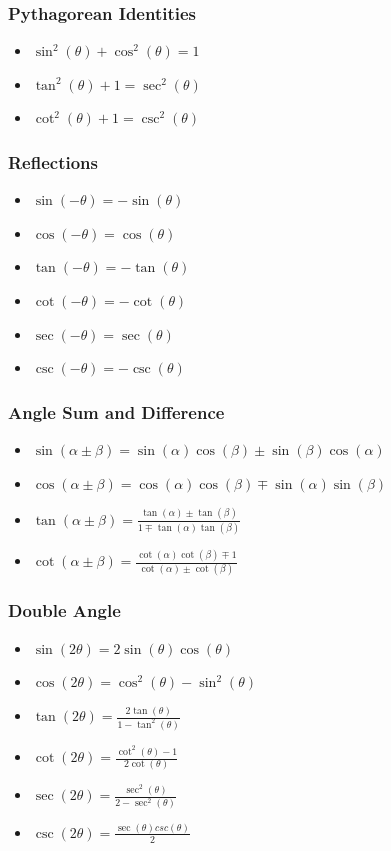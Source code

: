 \documentclass[a4paper, 15pt]{article}
\begin{document}
			\subsubsection{Pythagorean Identities}
				\begin{itemize}
					\item $\sin^2(\theta) + \cos^2(\theta) = 1$
					\item $\tan^2(\theta) + 1 = \sec^2(\theta)$
					\item $\cot^2(\theta) + 1 = \csc^2(\theta)$
				\end{itemize}

			\subsubsection{Reflections}
				\begin{itemize}
					\item $\sin(-\theta) = -\sin(\theta)$
					\item $\cos(-\theta) = \cos(\theta)$
					\item $\tan(-\theta) = -\tan(\theta)$
					\item $\cot(-\theta) = -\cot(\theta)$
					\item $\sec(-\theta) = \sec(\theta)$
					\item $\csc(-\theta) =  -\csc(\theta)$ 
				\end{itemize}

			\subsubsection{Angle Sum and Difference}
				\begin{itemize}
					\item $\sin(\alpha \pm \beta) = \sin(\alpha)\cos(\beta) \pm \sin(\beta)\cos(\alpha)$
					\item $\cos(\alpha \pm \beta) = \cos(\alpha)\cos(\beta) \mp \sin(\alpha)\sin(\beta)$
					\item $\tan(\alpha \pm \beta) = \frac{\tan(\alpha) \pm \tan(\beta)}{1 \mp \tan(\alpha)\tan(\beta)}$ 
					\item $\cot(\alpha \pm \beta) = \frac{\cot(\alpha)\cot(\beta) \mp 1}{\cot(\alpha) \pm \cot(\beta)}$
				\end{itemize}

			\subsubsection{Double Angle}
				\begin{itemize}
					\item $\sin(2\theta) = 2\sin(\theta)\cos(\theta)$
					\item $\cos(2\theta) = \cos^2(\theta) - \sin^2(\theta)$
					\item $\tan(2\theta) = \frac{2\tan(\theta)}{1-\tan^2(\theta)}$
					\item $\cot(2\theta) = \frac{\cot^2(\theta) - 1}{2\cot(\theta)}$
					\item $\sec(2\theta) = \frac{\sec^2(\theta)}{2-\sec^2(\theta)}$
					\item $\csc(2\theta) = \frac{\sec(\theta)csc(\theta)}{2}$
				\end{itemize}
\end{document}
